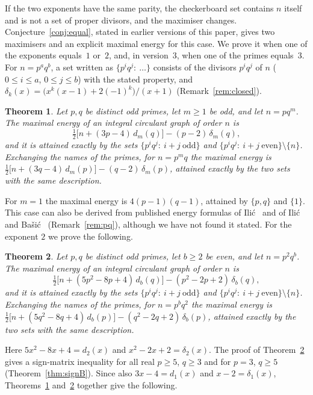 \documentclass[11pt]{article}
\newtheorem{theorem}{Theorem}
\theoremstyle{remark}
\begin{document}
If the two exponents have the same parity, the checkerboard set contains $n$
itself and is not a set of proper divisors, and the maximiser changes.
Conjecture~\ref{conj:equal}, stated in earlier versions of this paper, gives two
maximisers and an explicit maximal energy for this case. We prove it when one of
the exponents equals~$1$ or~$2$, and, in version~3, when one of the primes
equals~$3$. For $n=p^aq^b$, a set written as
$\{p^iq^j:\ \dots\}$ consists of the divisors $p^iq^j$ of $n$ ($0\le i\le a$,
$0\le j\le b$) with the stated property, and
$\delta_k(x)=\bigl(x^k(x-1)+2(-1)^k\bigr)/(x+1)$ (Remark~\ref{rem:closed}).

\begin{theorem}\label{thm:onem}
Let $p,q$ be distinct odd primes, let $m\ge1$ be odd, and let $n=pq^m$. The
maximal energy of an integral circulant graph of order $n$ is
\[
 \tfrac12\bigl[n+(3p-4)\,d_m(q)\bigr]-(p-2)\,\delta_m(q),
\]
and it is attained exactly by the sets $\{p^iq^j:\ i+j\ \text{odd}\}$ and
$\{p^iq^j:\ i+j\ \text{even}\}\setminus\{n\}$. Exchanging the names of the
primes, for $n=p^mq$ the maximal energy is
$\tfrac12\bigl[n+(3q-4)\,d_m(p)\bigr]-(q-2)\,\delta_m(p)$, attained exactly by
the two sets with the same description.
\end{theorem}

For $m=1$ the maximal energy is $4(p-1)(q-1)$, attained by $\{p,q\}$ and
$\{1\}$. This case can also be derived from published energy formulas of
Ili\'c~\cite{ilic} and of Ili\'c and Ba\v{s}i\'c~\cite{ilicbasic}
(Remark~\ref{rem:pq}), although we have not found it stated. For the
exponent $2$ we prove the following.

\begin{theorem}\label{thm:ptwo}
Let $p,q$ be distinct odd primes, let $b\ge2$ be even, and let $n=p^2q^b$.
The maximal energy of an integral circulant graph of order $n$ is
\[
 \tfrac12\bigl[n+(5p^2-8p+4)\,d_b(q)\bigr]-(p^2-2p+2)\,\delta_b(q),
\]
and it is attained exactly by the sets $\{p^iq^j:\ i+j\ \text{odd}\}$ and
$\{p^iq^j:\ i+j\ \text{even}\}\setminus\{n\}$. Exchanging the names of the
primes, for $n=p^bq^2$ the maximal energy is
$\tfrac12\bigl[n+(5q^2-8q+4)\,d_b(p)\bigr]-(q^2-2q+2)\,\delta_b(p)$, attained
exactly by the two sets with the same description.
\end{theorem}

Here $5x^2-8x+4=d_2(x)$ and $x^2-2x+2=\delta_2(x)$. The proof of
Theorem~\ref{thm:ptwo} gives a sign-matrix inequality for all real $p\ge5$,
$q\ge3$ and for $p=3$, $q\ge5$ (Theorem~\ref{thm:signB}). Since also
$3x-4=d_1(x)$ and $x-2=\delta_1(x)$, Theorems~\ref{thm:onem} and~\ref{thm:ptwo}
together give the following.
\end{document}
